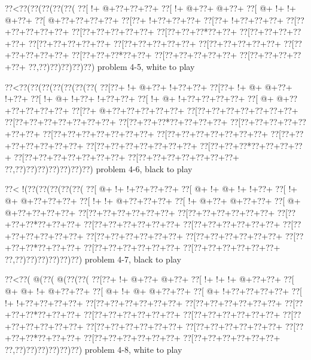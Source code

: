 \vbox{\vbox{\goo
\0??<\0??(\0??(\0??(\0??(\0??(
\0??[\- !+\- @+\0??+\0??+\0??+
\0??[\- !+\- @+\0??+\- @+\0??+
\0??[\- @+\- !+\- !+\- @+\0??+
\0??[\- @+\0??+\0??+\0??+\0??+
\0??[\0??+\- !+\0??+\0??+\0??+
\0??[\0??+\- !+\0??+\0??+\0??+
\0??[\0??+\0??+\0??+\0??+\0??+
\0??[\0??+\0??+\0??+\0??+\0??+
\0??[\0??+\0??+\0??*\0??+\0??+
\0??[\0??+\0??+\0??+\0??+\0??+
\0??[\0??+\0??+\0??+\0??+\0??+
\0??[\0??+\0??+\0??+\0??+\0??+
\0??[\0??+\0??+\0??+\0??+\0??+
\0??[\0??+\0??+\0??+\0??+\0??+
\0??[\0??+\0??+\0??*\0??+\0??+
\0??[\0??+\0??+\0??+\0??+\0??+
\0??[\0??+\0??+\0??+\0??+\0??+
\0??,\0??)\0??)\0??)\0??)\0??)
}
\hfil problem 4-5, white to play\hfil\break
}

\vbox{\vbox{\goo
\0??<\0??(\0??(\0??(\0??(\0??(\0??(\0??(
\0??[\0??+\- !+\- @+\0??+\- !+\0??+\0??+
\0??[\0??+\- !+\- @+\- @+\0??+\- !+\0??+
\0??[\- !+\- @+\- !+\0??+\- !+\0??+\0??+
\0??[\- !+\- @+\- !+\0??+\0??+\0??+\0??+
\0??[\- @+\- @+\0??+\0??+\0??+\0??+\0??+
\0??[\0??+\- @+\0??+\0??+\0??+\0??+\0??+
\0??[\0??+\0??+\0??+\0??+\0??+\0??+\0??+
\0??[\0??+\0??+\0??+\0??+\0??+\0??+\0??+
\0??[\0??+\0??+\0??*\0??+\0??+\0??+\0??+
\0??[\0??+\0??+\0??+\0??+\0??+\0??+\0??+
\0??[\0??+\0??+\0??+\0??+\0??+\0??+\0??+
\0??[\0??+\0??+\0??+\0??+\0??+\0??+\0??+
\0??[\0??+\0??+\0??+\0??+\0??+\0??+\0??+
\0??[\0??+\0??+\0??+\0??+\0??+\0??+\0??+
\0??[\0??+\0??+\0??*\0??+\0??+\0??+\0??+
\0??[\0??+\0??+\0??+\0??+\0??+\0??+\0??+
\0??[\0??+\0??+\0??+\0??+\0??+\0??+\0??+
\0??,\0??)\0??)\0??)\0??)\0??)\0??)\0??)
}
\hfil problem 4-6, black to play\hfil\break
}

\vbox{\vbox{\goo
\0??<\- !(\0??(\0??(\0??(\0??(\0??(
\0??[\- @+\- !+\- !+\0??+\0??+\0??+
\0??[\- @+\- !+\- @+\- !+\- !+\0??+
\0??[\- !+\- @+\- @+\0??+\0??+\0??+
\0??[\- !+\- !+\- @+\0??+\0??+\0??+
\0??[\- !+\- @+\0??+\- @+\0??+\0??+
\0??[\- @+\- @+\0??+\0??+\0??+\0??+
\0??[\0??+\0??+\0??+\0??+\0??+\0??+
\0??[\0??+\0??+\0??+\0??+\0??+\0??+
\0??[\0??+\0??+\0??*\0??+\0??+\0??+
\0??[\0??+\0??+\0??+\0??+\0??+\0??+
\0??[\0??+\0??+\0??+\0??+\0??+\0??+
\0??[\0??+\0??+\0??+\0??+\0??+\0??+
\0??[\0??+\0??+\0??+\0??+\0??+\0??+
\0??[\0??+\0??+\0??+\0??+\0??+\0??+
\0??[\0??+\0??+\0??*\0??+\0??+\0??+
\0??[\0??+\0??+\0??+\0??+\0??+\0??+
\0??[\0??+\0??+\0??+\0??+\0??+\0??+
\0??,\0??)\0??)\0??)\0??)\0??)\0??)
}
\hfil problem 4-7, black to play\hfil\break
}

\vbox{\vbox{\goo
\0??<\0??(\- @(\0??(\- @(\0??(\0??(
\0??[\0??+\- !+\- @+\0??+\- @+\0??+
\0??[\- !+\- !+\- !+\- @+\0??+\0??+
\0??[\- @+\- @+\- !+\- @+\0??+\0??+
\0??[\- @+\- !+\- @+\- @+\0??+\0??+
\0??[\- @+\- !+\0??+\0??+\0??+\0??+
\0??[\- !+\- !+\0??+\0??+\0??+\0??+
\0??[\0??+\0??+\0??+\0??+\0??+\0??+
\0??[\0??+\0??+\0??+\0??+\0??+\0??+
\0??[\0??+\0??+\0??*\0??+\0??+\0??+
\0??[\0??+\0??+\0??+\0??+\0??+\0??+
\0??[\0??+\0??+\0??+\0??+\0??+\0??+
\0??[\0??+\0??+\0??+\0??+\0??+\0??+
\0??[\0??+\0??+\0??+\0??+\0??+\0??+
\0??[\0??+\0??+\0??+\0??+\0??+\0??+
\0??[\0??+\0??+\0??*\0??+\0??+\0??+
\0??[\0??+\0??+\0??+\0??+\0??+\0??+
\0??[\0??+\0??+\0??+\0??+\0??+\0??+
\0??,\0??)\0??)\0??)\0??)\0??)\0??)
}
\hfil problem 4-8, white to play\hfil\break
}

